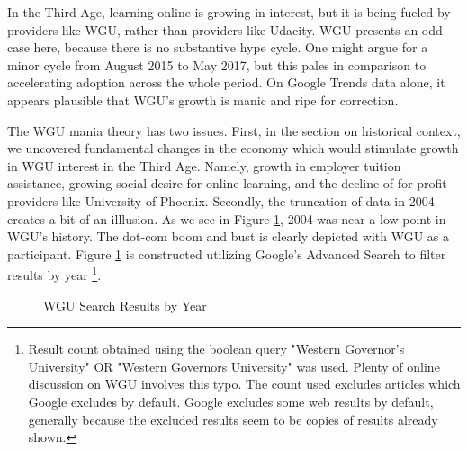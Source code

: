 \documentclass[review]{elsarticle}
\begin{document}
In the Third Age, learning online is growing in interest, but it is being fueled by providers
like WGU, rather than providers like Udacity.
WGU presents an odd case here, because there is no substantive hype cycle.
One might argue for a minor cycle from August 2015 to May 2017, but this pales in comparison to accelerating adoption across the whole period.
On Google Trends data alone, it appears plausible that WGU's growth is manic and ripe for correction.

The WGU mania theory has two issues.
First, in the section on historical context, we uncovered fundamental changes in the economy which would stimulate growth in WGU interest in the Third Age.
Namely, growth in employer tuition assistance, growing social desire for online learning,
and the decline of for-profit providers like University of Phoenix.
Secondly, the truncation of data in 2004 creates a bit of an illlusion.
As we see in Figure \ref{fig:wgu_search_results}, 2004 was near a low point in WGU's history.
The dot-com boom and bust is clearly depicted with WGU as a participant.
Figure \ref{fig:wgu_search_results} is constructed utilizing Google's Advanced Search to filter results by year
\footnote{
    Result count obtained using the boolean query "Western Governor's University" OR "Western Governors University" was used.
    Plenty of online discussion on WGU involves this typo.
    The count used excludes articles which Google excludes by default.
    Google excludes some web results by default, generally because the excluded results seem to be copies of results already shown.
}.

\begin{figure}[h!]
    \centering
    \caption{WGU Search Results by Year}


    \label{fig:wgu_search_results}
\end{figure}
\end{document}
